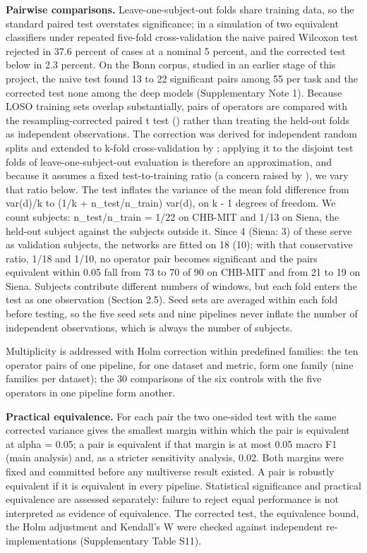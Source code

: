 \documentclass[11pt,a4paper]{article}
\newcounter{none} %
\begin{document}
\textbf{Pairwise comparisons.} Leave-one-subject-out folds share training data, so the
standard paired test overstates significance; in a simulation of two equivalent
classifiers under repeated five-fold cross-validation the naive paired Wilcoxon test
rejected in 37.6 percent of cases at a nominal 5 percent, and the corrected test below in
2.3 percent. On the Bonn corpus, studied in an
earlier stage of this project, the naive test found 13 to 22 significant pairs among
55 per task and the corrected test none among the deep models (Supplementary Note 1).
Because LOSO training sets overlap substantially, pairs of operators are compared with
the resampling-corrected paired t test (\citealp{Nadeau_2003}) rather than treating
the held-out folds as independent observations. The correction was derived for
independent random splits and extended to k-fold cross-validation by \citet{Bouckaert_2004}; applying it to the disjoint test folds of leave-one-subject-out evaluation is
therefore an approximation, and because it assumes a fixed test-to-training ratio (a
concern raised by \citealp{Del_Pup_2025}), we vary that ratio below. The test inflates the variance of the
mean fold difference from var(d)/k to (1/k + n\_test/n\_train) var(d), on k - 1 degrees
of freedom. We count subjects: n\_test/n\_train = 1/22 on CHB-MIT and 1/13 on Siena, the
held-out subject against the subjects outside it. Since 4 (Siena: 3) of these serve as
validation subjects, the networks are fitted on 18 (10); with that conservative ratio,
1/18 and 1/10, no operator pair becomes significant and the pairs equivalent within
0.05 fall from 73 to 70 of 90 on CHB-MIT and from 21 to 19 on Siena.
Subjects contribute different numbers of
windows, but each fold enters the test as one observation (Section 2.5). Seed sets are
averaged within each fold before testing, so the five seed sets and nine pipelines
never inflate the number of independent observations, which is always the number of
subjects.

Multiplicity is addressed with Holm correction within predefined families: the ten
operator pairs of one pipeline, for one dataset and metric, form one family (nine
families per dataset); the 30 comparisons of the six controls with the five operators
in one pipeline form another.

\textbf{Practical equivalence.} For each pair the two one-sided test with the same
corrected variance gives the smallest margin within which the pair is equivalent at
alpha = 0.05; a pair is equivalent if that margin is at most 0.05 macro F1 (main
analysis) and, as a stricter sensitivity analysis, 0.02. Both margins were fixed and
committed before any multiverse result existed. A pair is robustly equivalent if it is
equivalent in every pipeline. Statistical significance and practical equivalence are
assessed separately: failure to reject equal performance is not interpreted as
evidence of equivalence. The corrected test, the equivalence bound, the Holm
adjustment and Kendall's W were checked against independent re-implementations
(Supplementary Table S11).
\end{document}
